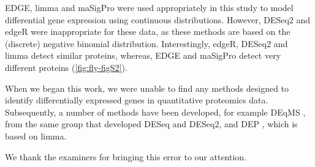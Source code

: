 EDGE, limma and maSigPro were used appropriately in this study to model differential gene expression using
continuous distributions. However, DESeq2 and edgeR were inappropriate for these data, as these methods are
based on the (discrete) negative binomial distribution. Interestingly, edgeR, DESeq2 and limma detect similar proteins,
whereas, EDGE and maSigPro detect very different proteins (\ref{fig:fly-figS2}).

When we began this work, we were unable to find any methods designed to identify differentially expressed genes
in quantitative proteomics data. Subsequently, a number of methods have been developed, for example DEqMS \cite{Zhu2020a},
from the same group that developed DESeq and DESeq2, and DEP \cite{Zhang2018}, which is based on limma.

We thank the examiners for bringing this error to our attention.